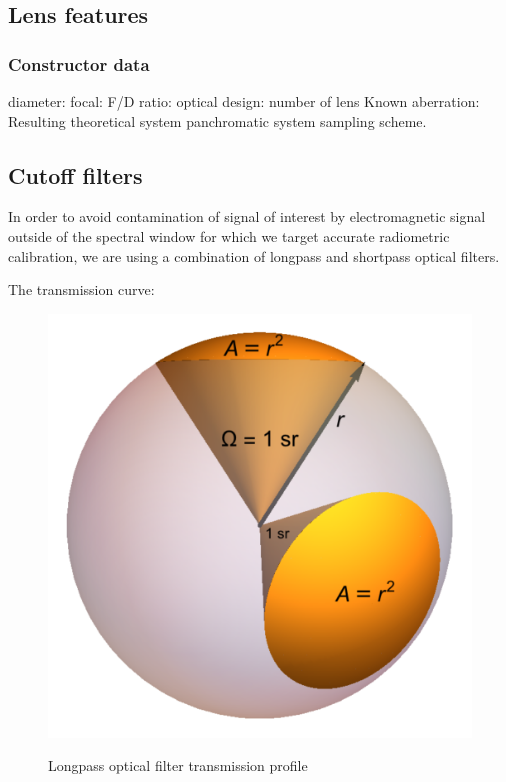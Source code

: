 \documentclass{article}
\begin{document}
        \subsection{Lens features}
    \subsubsection{Constructor data}
    diameter:
    focal:
    F/D ratio:
    optical design: number of lens
    Known aberration:
    Resulting theoretical system panchromatic system sampling scheme.

  \subsection{Cutoff filters}
  In order to avoid contamination of signal of interest by electromagnetic signal outside of the spectral window for which we target accurate radiometric calibration, we are using a combination of longpass and shortpass optical filters.

  The transmission curve:
  \begin{figure}[h!]
    \includegraphics[width=1.0\textwidth]{../../figures/Solid_Angle_1_Steradian.png}\\
    \caption{Longpass optical filter transmission profile}
  \end{figure}
\end{document}
